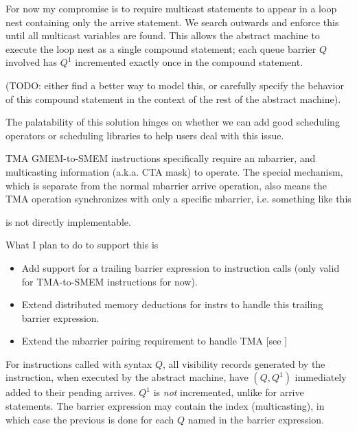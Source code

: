 \filbreak
For now my compromise is to require multicast  statements to appear in a  loop nest containing only the arrive statement.
We search outwards and enforce this until all multicast variables are found.
This allows the abstract machine to execute the loop nest as a single compound statement; each queue barrier $Q$ involved has $Q^1$ incremented exactly once in the compound statement.

\filbreak


\filbreak


\filbreak
(TODO: either find a better way to model this, or carefully specify the behavior of this compound statement in the context of the rest of the abstract machine).

\filbreak
The palatability of this solution hinges on whether we can add good scheduling operators or scheduling libraries to help users deal with this issue.

\filbreak
{}

TMA GMEM-to-SMEM instructions specifically require an mbarrier, and multicasting information (a.k.a. CTA mask) to operate.
The special  mechanism, which is separate from the normal mbarrier arrive operation, also means the TMA operation synchronizes with only a specific mbarrier, i.e. something like this



is not directly implementable.

\filbreak
What I plan to do to support this is
\begin{itemize}
  \item Add support for a trailing barrier expression  to instruction calls (only valid for TMA-to-SMEM instructions for now).
  \filbreak
  \item Extend distributed memory deductions for instrs to handle this trailing barrier expression.
  \filbreak
  \item Extend the mbarrier pairing requirement to handle TMA [see ]
\end{itemize}

\filbreak
{} For instructions called with syntax  $Q$, all visibility records generated by the instruction, when executed by the abstract machine, have $(Q, Q^1)$ immediately added to their pending arrives.
$Q^1$ is \textit{not} incremented, unlike for arrive statements.
The barrier expression may contain the \lighttt{:} index (multicasting), in which case the previous is done for each $Q$ named in the barrier expression.

